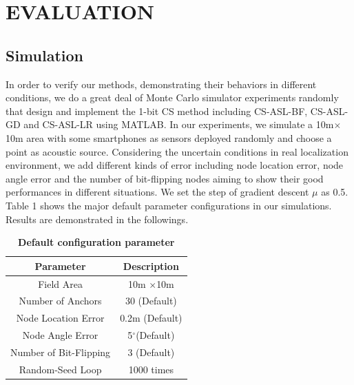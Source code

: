 \section{EVALUATION }
\label{section:results}

\subsection{Simulation}
In order to verify our methods, demonstrating their behaviors in different conditions, we do a great deal of Monte Carlo simulator experiments randomly that design and implement the 1-bit CS method including CS-ASL-BF, CS-ASL-GD and CS-ASL-LR using MATLAB.
In our experiments, we simulate a 10m$\times$10m area with some smartphones as sensors deployed randomly and choose a point as acoustic source. Considering the uncertain conditions in real localization environment, we add different kinds of error including node location error, node angle error and the number of bit-flipping nodes aiming to show their good performances in different situations. We set the step of gradient descent $\mu$ as 0.5. Table 1 shows the major default parameter configurations in our simulations. Results are demonstrated in the followings.

\begin{table} \normalsize
\caption {\textbf{Default configuration parameter}} %
\centering %
    \begin{tabular}{|c|c|}
        \hline
\textbf{Parameter} & \textbf{Description} \\
 \hline
Field Area & 10m $\times$10m \\
\hline
Number of Anchors & 30 (Default) \\
 \hline
Node Location Error 	 & 0.2m (Default) \\
\hline
Node Angle Error & 5$^{\circ} $(Default) \\
\hline
Number of Bit-Flipping & 3 (Default) \\
 \hline
Random-Seed Loop	 & 1000 times  \\
        \hline
    \end{tabular}
\end{table}

